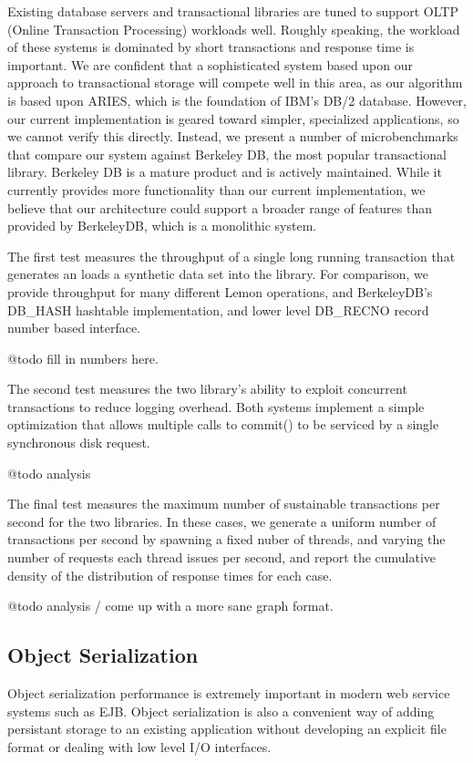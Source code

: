 \documentclass[letterpaper,twocolumn,english]{article}
\newcommand{\yad}{Lemon\xspace}
\begin{document}
Existing database servers and transactional libraries are tuned to
support OLTP (Online Transaction Processing) workloads well.  Roughly
speaking, the workload of these systems is dominated by short
transactions and response time is important.  We are confident that a
sophisticated system based upon our approach to transactional storage
will compete well in this area, as our algorithm is based upon ARIES,
which is the foundation of IBM's DB/2 database.  However, our current
implementation is geared toward simpler, specialized applications, so
we cannot verify this directly.  Instead, we present a number of
microbenchmarks that compare our system against Berkeley DB, the most
popular transactional library.  Berkeley DB is a mature product and is
actively maintained.  While it currently provides more functionality
than our current implementation, we believe that our architecture
could support a broader range of features than provided by BerkeleyDB,
which is a monolithic system.

The first test measures the throughput of a single long running
transaction that generates an loads a synthetic data set into the
library.  For comparison, we provide throughput for many different
\yad operations, and BerkeleyDB's DB\_HASH hashtable implementation,
and lower level DB\_RECNO record number based interface.

@todo fill in numbers here.

The second test measures the two library's ability to exploit
concurrent transactions to reduce logging overhead.  Both systems
implement a simple optimization that allows multiple calls to commit()
to be serviced by a single synchronous disk request.  

@todo analysis

The final test measures the maximum number of sustainable transactions
per second for the two libraries.  In these cases, we generate a
uniform number of transactions per second by spawning a fixed nuber of
threads, and varying the number of requests each thread issues per
second, and report the cumulative density of the distribution of
response times for each case.

@todo analysis / come up with a more sane graph format.

\subsection{Object Serialization}\label{OASYS}

Object serialization performance is extremely important in modern web
service systems such as EJB.  Object serialization is also a
convenient way of adding persistant storage to an existing application
without developing an explicit file format or dealing with low level
I/O interfaces.
\end{document}
